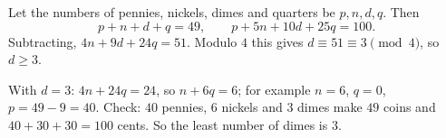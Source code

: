 Let the numbers of pennies, nickels, dimes and quarters be $p,n,d,q$. Then
\[
p+n+d+q=49,\qquad p+5n+10d+25q=100 .
\]
Subtracting, $4n+9d+24q=51$. Modulo $4$ this gives $d\equiv51\equiv3\pmod4$, so $d\ge3$.

With $d=3$: $4n+24q=24$, so $n+6q=6$; for example $n=6$, $q=0$, $p=49-9=40$. Check: $40$ pennies, $6$ nickels and $3$ dimes make $49$ coins and $40+30+30=100$ cents. So the least number of dimes is $\boxed{3}$.
